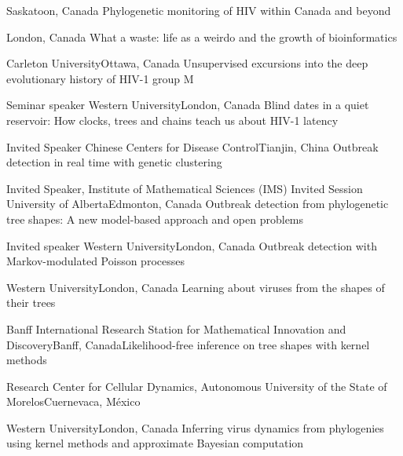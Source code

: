 {}{Saskatoon, Canada}
{Phylogenetic monitoring of HIV within Canada and beyond}

{}{London, Canada}
{What a waste: life as a weirdo and the growth of bioinformatics}

{Carleton University}{Ottawa, Canada}
{Unsupervised excursions into the deep evolutionary history of HIV-1 group M}

{Seminar speaker}
{Western University}{London, Canada}
{Blind dates in a quiet reservoir: How clocks, trees and chains teach us about HIV-1 latency}

{Invited Speaker}
{Chinese Centers for Disease Control}{Tianjin, China}
{Outbreak detection in real time with genetic clustering}

{Invited Speaker, Institute of Mathematical Sciences (IMS) Invited Session}
{University of Alberta}{Edmonton, Canada}
{Outbreak detection from phylogenetic tree shapes: A new model-based approach and open problems}

{Invited speaker}
{Western University}{London, Canada}
{Outbreak detection with Markov-modulated Poisson processes}

{Western University}{London, Canada}
{Learning about viruses from the shapes of their trees}

{Banff International Research Station for Mathematical Innovation and Discovery}{Banff, Canada}{Likelihood-free inference on tree shapes with kernel methods}

{Research Center for Cellular Dynamics, Autonomous University of the State of Morelos}{Cuernevaca, M\'exico}
{}

{Western University}{London, Canada}
{Inferring virus dynamics from phylogenies using kernel methods and approximate Bayesian computation}

